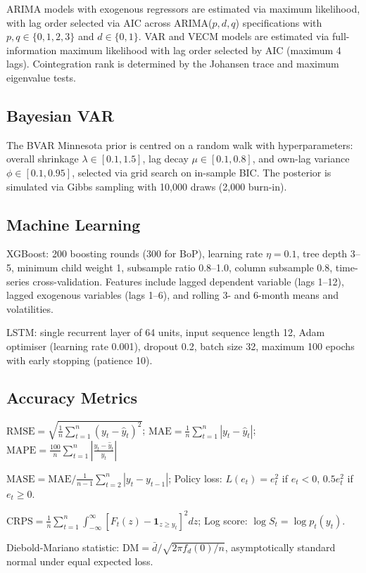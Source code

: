 \documentclass[12pt,a4paper]{article}
\begin{document}
ARIMA models with exogenous regressors are estimated via maximum likelihood, with lag order selected via AIC across ARIMA($p,d,q$) specifications with $p, q \in \{0,1,2,3\}$ and $d \in \{0,1\}$. VAR and VECM models are estimated via full-information maximum likelihood with lag order selected by AIC (maximum 4 lags). Cointegration rank is determined by the Johansen trace and maximum eigenvalue tests.

\subsection{Bayesian VAR}

The BVAR Minnesota prior is centred on a random walk with hyperparameters: overall shrinkage $\lambda \in [0.1, 1.5]$, lag decay $\mu \in [0.1, 0.8]$, and own-lag variance $\phi \in [0.1, 0.95]$, selected via grid search on in-sample BIC. The posterior is simulated via Gibbs sampling with 10,000 draws (2,000 burn-in).

\subsection{Machine Learning}

XGBoost: 200 boosting rounds (300 for BoP), learning rate $\eta = 0.1$, tree depth 3--5, minimum child weight 1, subsample ratio 0.8--1.0, column subsample 0.8, time-series cross-validation. Features include lagged dependent variable (lags 1--12), lagged exogenous variables (lags 1--6), and rolling 3- and 6-month means and volatilities.

LSTM: single recurrent layer of 64 units, input sequence length 12, Adam optimiser (learning rate 0.001), dropout 0.2, batch size 32, maximum 100 epochs with early stopping (patience 10).

\subsection{Accuracy Metrics}

$\text{RMSE} = \sqrt{\frac{1}{n} \sum_{t=1}^{n} (y_t - \hat{y}_t)^2}$; \quad $\text{MAE} = \frac{1}{n} \sum_{t=1}^{n} |y_t - \hat{y}_t|$; \quad $\text{MAPE} = \frac{100}{n} \sum_{t=1}^{n} \left| \frac{y_t - \hat{y}_t}{y_t} \right|$

$\text{MASE} = \text{MAE} \big/ \frac{1}{n-1} \sum_{t=2}^{n} |y_t - y_{t-1}|$; \quad Policy loss: $L(e_t) = e_t^2$ if $e_t < 0$, $0.5 e_t^2$ if $e_t \geq 0$.

$\text{CRPS} = \frac{1}{n} \sum_{t=1}^{n} \int_{-\infty}^{\infty} [F_t(z) - \mathbf{1}_{z \geq y_t}]^2 dz$; \quad Log score: $\log S_t = \log p_t(y_t)$.

Diebold-Mariano statistic: $\text{DM} = \bar{d} / \sqrt{2\pi f_d(0) / n}$, asymptotically standard normal under equal expected loss.
\end{document}
